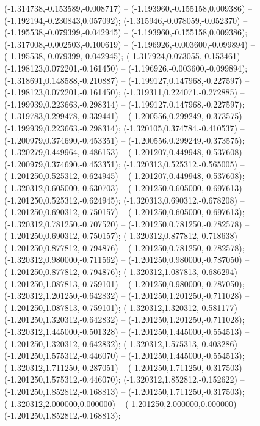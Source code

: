  (-1.314738,-0.153589,-0.008717) -- (-1.193960,-0.155158,0.009386) -- (-1.192194,-0.230843,0.057092);
 (-1.315946,-0.078059,-0.052370) -- (-1.195538,-0.079399,-0.042945) -- (-1.193960,-0.155158,0.009386);
 (-1.317008,-0.002503,-0.100619) -- (-1.196926,-0.003600,-0.099894) -- (-1.195538,-0.079399,-0.042945);
 (-1.317924,0.073055,-0.153461) -- (-1.198123,0.072201,-0.161450) -- (-1.196926,-0.003600,-0.099894);
 (-1.318691,0.148588,-0.210887) -- (-1.199127,0.147968,-0.227597) -- (-1.198123,0.072201,-0.161450);
 (-1.319311,0.224071,-0.272885) -- (-1.199939,0.223663,-0.298314) -- (-1.199127,0.147968,-0.227597);
 (-1.319783,0.299478,-0.339441) -- (-1.200556,0.299249,-0.373575) -- (-1.199939,0.223663,-0.298314);
 (-1.320105,0.374784,-0.410537) -- (-1.200979,0.374690,-0.453351) -- (-1.200556,0.299249,-0.373575);
 (-1.320279,0.449964,-0.486153) -- (-1.201207,0.449948,-0.537608) -- (-1.200979,0.374690,-0.453351);
 (-1.320313,0.525312,-0.565005) -- (-1.201250,0.525312,-0.624945) -- (-1.201207,0.449948,-0.537608);
 (-1.320312,0.605000,-0.630703) -- (-1.201250,0.605000,-0.697613) -- (-1.201250,0.525312,-0.624945);
 (-1.320313,0.690312,-0.678208) -- (-1.201250,0.690312,-0.750157) -- (-1.201250,0.605000,-0.697613);
 (-1.320312,0.781250,-0.707520) -- (-1.201250,0.781250,-0.782578) -- (-1.201250,0.690312,-0.750157);
 (-1.320312,0.877812,-0.718638) -- (-1.201250,0.877812,-0.794876) -- (-1.201250,0.781250,-0.782578);
 (-1.320312,0.980000,-0.711562) -- (-1.201250,0.980000,-0.787050) -- (-1.201250,0.877812,-0.794876);
 (-1.320312,1.087813,-0.686294) -- (-1.201250,1.087813,-0.759101) -- (-1.201250,0.980000,-0.787050);
 (-1.320312,1.201250,-0.642832) -- (-1.201250,1.201250,-0.711028) -- (-1.201250,1.087813,-0.759101);
 (-1.320312,1.320312,-0.581177) -- (-1.201250,1.320312,-0.642832) -- (-1.201250,1.201250,-0.711028);
 (-1.320312,1.445000,-0.501328) -- (-1.201250,1.445000,-0.554513) -- (-1.201250,1.320312,-0.642832);
 (-1.320312,1.575313,-0.403286) -- (-1.201250,1.575312,-0.446070) -- (-1.201250,1.445000,-0.554513);
 (-1.320312,1.711250,-0.287051) -- (-1.201250,1.711250,-0.317503) -- (-1.201250,1.575312,-0.446070);
 (-1.320312,1.852812,-0.152622) -- (-1.201250,1.852812,-0.168813) -- (-1.201250,1.711250,-0.317503);
 (-1.320312,2.000000,0.000000) -- (-1.201250,2.000000,0.000000) -- (-1.201250,1.852812,-0.168813);
